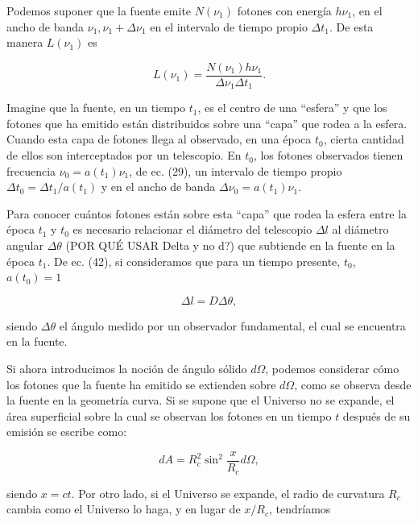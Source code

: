 \documentclass[11pt]{article}
\begin{document}
Podemos suponer que la fuente emite $N(\nu_1)$ fotones con energía $h \nu_1$, en el ancho de banda $\nu_1, \nu_1 + \Delta \nu_1$ en el intervalo de tiempo propio $\Delta t_1$. De esta manera $L(\nu_1)$ es

    \begin{equation}
        L(\nu_1) = \frac{N(\nu_1) h \nu_1 }{\Delta \nu_1 \Delta t_1}.
    \end{equation}
    
    Imagine que la fuente, en un tiempo $t_1$, es el centro de una ``esfera'' y que los fotones que ha emitido están distribuidos sobre una ``capa'' que rodea a la esfera. Cuando esta capa de fotones llega al observado, en una época $t_0$, cierta cantidad de ellos son interceptados por un telescopio. En $t_0$, los fotones observados tienen frecuencia $\nu_0 = a(t_1) \nu_1$, de ec. (29), un intervalo de tiempo propio $ \Delta t_0 = \Delta t_1/a(t_1)$ y en el ancho de banda $ \Delta \nu_0 = a(t_1) \nu_1$.

    Para conocer cuántos fotones están sobre esta ``capa'' que rodea la esfera entre la época $t_1$ y $t_0$ es necesario relacionar el diámetro del telescopio $\Delta l$  al diámetro angular $\Delta \theta$ (POR QUÉ USAR Delta y no d?) que subtiende en la fuente en la época $t_1$. De ec. (42), si consideramos que para un tiempo presente, $t_0$, $a(t_0) = 1$
    
    \begin{equation}
        \Delta l = D \Delta \theta,
    \end{equation}
    
    siendo $\Delta \theta$ el ángulo medido por un observador fundamental, el cual se encuentra en la fuente. 
    


    Si ahora introducimos la noción de ángulo sólido $d\Omega$, podemos considerar cómo los fotones que la fuente ha emitido se extienden sobre $d \Omega$, como se observa desde la fuente en la geometría curva. Si se supone que el Universo no se expande, el área superficial sobre la cual se observan los fotones en un tiempo $t$ después de su emisión se escribe como: 

    \begin{equation}
        dA = R_c^2 \sin^2 \frac{x}{R_c} d\Omega,
    \end{equation}

    siendo $x = ct$. Por otro lado, si el Universo se expande, el radio de curvatura $R_c$ cambia como el Universo lo haga, y en lugar de $x/R_c$, tendríamos 
\end{document}
